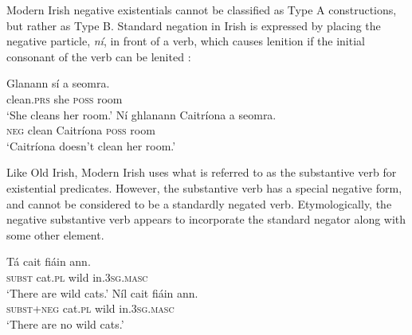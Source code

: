 ﻿\documentclass[output=paper]{langsci/langscibook}
\begin{document}
Modern Irish negative existentials cannot be classified as
Type A constructions, but rather as Type B. Standard negation in
Irish is expressed by placing the negative particle, \textit{ní}, in front of a verb, which causes lenition if the initial consonant of the verb can be lenited \citep[86]{Stenson2008}:
%
\begin{exe}\ex
{}
\begin{xlist}
\ex \gll Glanann sí a seomra. \\
clean.\textsc{prs}  she \textsc{poss} room \\
    \glt `She cleans her room.' 
\ex\gll Ní ghlanann Caitríona a seomra.\\
\textsc{neg} clean        Caitríona  \textsc{poss} room\\
\glt `Caitríona doesn't clean her room.' 
\end{xlist}\end{exe}
%
Like Old Irish, Modern Irish uses what is referred to as the substantive verb for existential predicates. However, the substantive verb has a special negative form, and cannot be considered to be a standardly negated verb. Etymologically, the negative substantive verb appears to incorporate the standard negator along with some other element. 
%
\begin{exe}\ex
{}
\begin{xlist}
\ex \gll Tá cait fiáin ann. \\
    \textsc{subst} cat.\textsc{pl} wild in.\textsc{3sg}.\textsc{masc} \\
    \glt `There are wild cats.'
\ex\gll Níl cait fiáin ann.\\
    \textsc{subst}+\textsc{neg} cat.\textsc{pl} wild in.\textsc{3sg.masc}\\
    \glt `There are no wild cats.'
\end{xlist}\end{exe}
\end{document}
